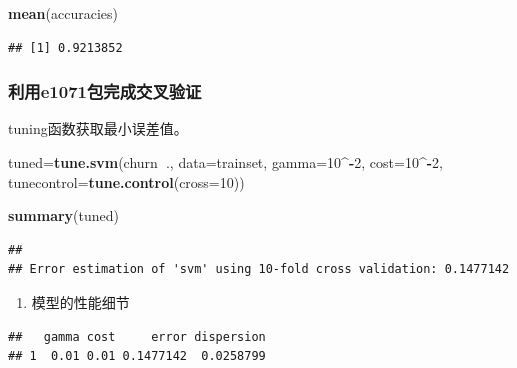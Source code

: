 \documentclass[
]{article}
\newenvironment{Shaded}{\begin{snugshade}}{\end{snugshade}}
\newcommand{\DataTypeTok}[1]{\textcolor[rgb]{0.13,0.29,0.53}{#1}}
\newcommand{\DecValTok}[1]{\textcolor[rgb]{0.00,0.00,0.81}{#1}}
\newcommand{\KeywordTok}[1]{\textcolor[rgb]{0.13,0.29,0.53}{\textbf{#1}}}
\newcommand{\NormalTok}[1]{#1}
\newcommand{\OperatorTok}[1]{\textcolor[rgb]{0.81,0.36,0.00}{\textbf{#1}}}
\providecommand{\tightlist}{%
  \setlength{\itemsep}{0pt}\setlength{\parskip}{0pt}}
\begin{document}
\begin{Shaded}
\begin{Highlighting}[]
\KeywordTok{mean}\NormalTok{(accuracies)}
\end{Highlighting}
\end{Shaded}

\begin{verbatim}
## [1] 0.9213852
\end{verbatim}

\hypertarget{ux5229ux7528e1071ux5305ux5b8cux6210ux4ea4ux53c9ux9a8cux8bc1}{%
\subsubsection{利用e1071包完成交叉验证}\label{ux5229ux7528e1071ux5305ux5b8cux6210ux4ea4ux53c9ux9a8cux8bc1}}

tuning函数获取最小误差值。

\begin{Shaded}
\begin{Highlighting}[]
\NormalTok{tuned=}\KeywordTok{tune.svm}\NormalTok{(churn}\OperatorTok{~}\NormalTok{.,}
               \DataTypeTok{data=}\NormalTok{trainset,}
               \DataTypeTok{gamma=}\DecValTok{10}\OperatorTok{^-}\DecValTok{2}\NormalTok{,}
               \DataTypeTok{cost=}\DecValTok{10}\OperatorTok{^-}\DecValTok{2}\NormalTok{,}
               \DataTypeTok{tunecontrol=}\KeywordTok{tune.control}\NormalTok{(}\DataTypeTok{cross=}\DecValTok{10}\NormalTok{))}

\KeywordTok{summary}\NormalTok{(tuned)}
\end{Highlighting}
\end{Shaded}

\begin{verbatim}
## 
## Error estimation of 'svm' using 10-fold cross validation: 0.1477142
\end{verbatim}

\begin{enumerate}
\def\labelenumi{\arabic{enumi}.}
\setcounter{enumi}{2}
\tightlist
\item
  模型的性能细节
\end{enumerate}

\begin{Shaded}
\end{Shaded}

\begin{verbatim}
##   gamma cost     error dispersion
## 1  0.01 0.01 0.1477142  0.0258799
\end{verbatim}
\end{document}

